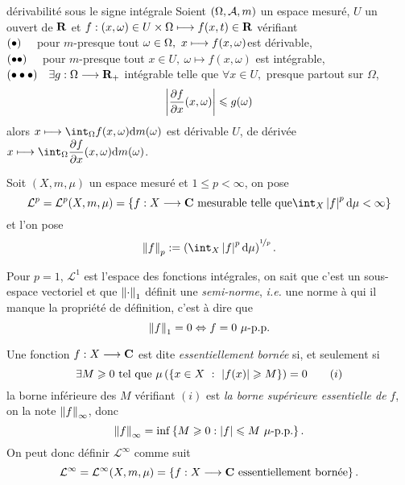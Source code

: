 \documentclass[a4paper,11pt, twoside]{article}
\begin{document}
    
\begin{thC}{dérivabilité sous le signe intégrale}
  Soient $(\Omega,\mathcal A,m)$ un espace mesuré, $U$ un ouvert de $\mathbf R$ et $f:(x,\omega)\in U\times\Omega\longmapsto f(x,t)\in\mathbf R$ vérifiant\\
  $(\bullet)\quad$ pour $m$-presque tout $\omega\in\Omega,\ x\longmapsto f(x,\omega)$est dérivable,\\
  $(\bullet\bullet)\quad$ pour $m$-presque tout $x\in U,\ \omega\longmapsto f(x,\omega)$ est intégrable,\\
  $(\bullet\bullet\bullet)\quad\exists g:\Omega\longrightarrow\mathbf R_+$ intégrable telle que $\forall x\in U,$ presque partout sur $\Omega$,
  $$\bigg|\displaystyle\frac{\partial f}{\partial x}(x,\omega)\bigg|\leqslant g(\omega)$$
  alors $x\longmapsto\dstyle\int_{\O}f(x,\omega)\mathrm{d}m(\omega)$ est dérivable $U$, de dérivée $x\longmapsto\dstyle\int_{\O}\frac{\partial f}{\partial x}(x,\omega)\mathrm{d}m(\omega)$.
\end{thC}



\begin{Def}
  Soit $(X,m,\mu)$ un espace mesuré et $1\leqslant p< \infty$, on pose 
$$\mathcal L^p=\mathcal L^p(X,m,\mu)=\ens{f:X\longrightarrow\C\text{ mesurable telle que}\int_X\abs{f}^p\mathrm d\mu<\infty}$$
et l'on pose 
$$\norm{f}_p:=\left(\int_X\abs{f}^p\mathrm d\mu\right)^{\nicefrac{1}{p}}.$$
\end{Def}


\begin{RQ}
  Pour $p=1$, $\mathcal L^1$ est l'espace des fonctions intégrales, on sait que c'est un sous-espace vectoriel et que $\left\lVert\cdot\right\rVert_1$ définit une \emph{semi-norme}, \emph{i.e.} une norme à qui il manque la propriété de définition, c'est à dire que 
$$\norm{f}_1=0\Leftrightarrow f=0\ \mu\text{-p.p.}$$
\end{RQ}

\begin{Def}
  Une fonction $f:X\longrightarrow\mathbf C$ est dite \emph{essentiellement bornée} si, et seulement si 
$$\exists M\geqslant 0\text{ tel que }\mu\left(\left\{x\in X\ :\ \left| f(x)\right|\geqslant M\right\}\right)=0\qquad (i)$$
la borne inférieure des $M$ vérifiant $(i)$ est \emph{la borne supérieure essentielle de }$f$, on la note $\left\lVert f\right\rVert_{\infty}$, donc 
$$\left\lVert f\right\rVert_\infty=\mathrm{inf}\left\{M\geqslant 0 : \left| f\right|\leqslant M\ \mu\text{-p.p.}\right\}.$$
On peut donc définir $\mathcal L^\infty$ comme suit
$$\mathcal L^\infty=\mathcal L^\infty(X,m,\mu)=\left\{f:X\longrightarrow\mathbf C\text{ essentiellement bornée}\right\}.$$
\end{Def}
\end{document}
